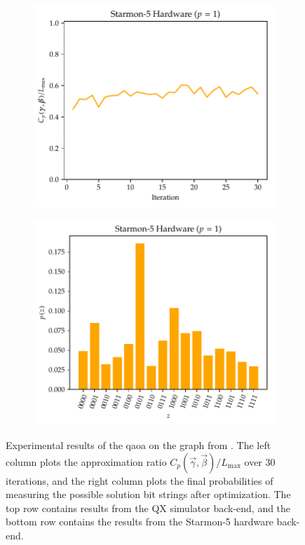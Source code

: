 \begin{figure}[ht]
    \begin{subfigure}{.49\textwidth}
        \centering
        \includegraphics[width=1\linewidth]{figures/qaoa_maxcut_n4_p1_starmon_optimization.pdf}
    \end{subfigure}
    \hfill
    \begin{subfigure}{.49\textwidth}
        \centering
        \includegraphics[width=1\linewidth]{figures/qaoa_maxcut_n4_p1_starmon_probs.pdf}
    \end{subfigure}

    \caption[Experimental results of the \gls{qaoa} on the graph from .]{
        Experimental results of the \gls{qaoa} on the graph from .
        The left column plots the approximation ratio $C_p(\vec{\gamma}, \vec{\beta})/L_\text{max}$ over 30 iterations, and the right column plots the final probabilities of measuring the possible solution bit strings after optimization.
        The top row contains results from the QX simulator back-end, and the bottom row contains the results from the Starmon-5 hardware back-end.
    }
    \label{fig:qaoa-results}
\end{figure}